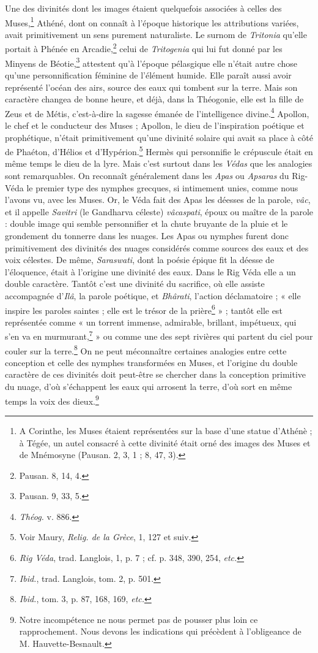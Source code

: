 \documentclass[landscape, a4paper, 11pt, oneside, polutonikogreek, french]{article}
\begin{document}
Une des divinités dont les images étaient quelquefois associées à celles des Muses,\footnote{A Corinthe, les Muses étaient représentées sur la base d'une statue d'Athénè ; à Tégée, un autel consacré à cette divinité était orné des images des Muses et de Mnémosyne (Pausan. 2, 3, 1 ; 8, 47, 3).} Athéné, dont on connaît à l'époque historique les attributions variées, avait primitivement un sens purement naturaliste. Le surnom de \emph{Tritonia} qu'elle portait à Phénée en Arcadie,\footnote{Pausan. 8, 14, 4.} celui de \emph{Tritogenia} qui lui fut donné par les Minyens de Béotie,\footnote{Pausan. 9, 33, 5.} attestent qu'à l'époque pélasgique elle n'était autre chose qu'une personnification féminine de l'élément humide. Elle paraît aussi avoir représenté l'océan des airs, source des eaux qui tombent sur la terre. Mais son caractère changea de bonne heure, et déjà, dans la Théogonie, elle est la fille de Zeus et de Métis, c'est-à-dire la sagesse émanée de l'intelligence divine.\footnote{\emph{Théog.} v. 886.} Apollon, le chef et le conducteur des Muses ; Apollon, le dieu de l'inspiration poétique et prophétique, n'était primitivement qu'une divinité solaire qui avait sa place à côté de Phaéton, d'Hélios et d'Hypérion.\footnote{Voir Maury, \emph{Relig. de la Grèce}, 1, 127 et suiv.} Hermès qui personnifie le crépuscule était en même temps le dieu de la lyre. Mais c'est surtout dans les \emph{Védas} que les analogies sont remarquables. On reconnaît généralement dans les \emph{Apas} ou \emph{Apsaras} du Rig-Véda le premier type des nymphes grecques, si intimement unies, comme nous l'avons vu, avec les Muses. Or, le Véda fait des Apas les déesses de la parole, \emph{vâc}, et il appelle \emph{Savitri} (le Gandharva céleste) \emph{vâcaspati}, époux ou maître de la parole : double image qui semble personnifier et la chute bruyante de la pluie et le grondement du tonnerre dans les nuages. Les Apas ou nymphes furent donc primitivement des divinités des nuages considérés comme sources des eaux et des voix célestes. De même, \emph{Saraswati}, dont la poésie épique fit la déesse de l'éloquence, était à l'origine une divinité des eaux. Dans le Rig Véda elle a un double caractère. Tantôt c'est une divinité du sacrifice, où elle assiste accompagnée d'\emph{Ilâ}, la parole poétique, et \emph{Bhârati}, l'action déclamatoire ; « elle inspire les paroles saintes ; elle est le trésor de la prière\footnote{\emph{Rig Véda}, trad. Langlois, 1, p. 7 ; cf. p. 348, 390, 254, \emph{etc.}} » ; tantôt elle est représentée comme « un torrent immense, admirable, brillant, impétueux, qui s'en va en murmurant,\footnote{\emph{Ibid.}, trad. Langlois, tom. 2, p. 501.} » ou comme une des sept rivières qui partent du ciel pour couler sur la terre.\footnote{\emph{Ibid.}, tom. 3, p. 87, 168, 169, \emph{etc.}} On ne peut méconnaître certaines analogies entre cette conception et celle des nymphes transformées en Muses, et l'origine du double caractère de ces divinités doit peut-être se chercher dans la conception primitive du nuage, d'où s'échappent les eaux qui arrosent la terre, d'où sort en même temps la voix des dieux.\footnote{Notre incompétence ne nous permet pas de pousser plus loin ce rapprochement. Nous devons les indications qui précèdent à l'obligeance de M. Hauvette-Besnault.}
\clearpage
\end{document}
